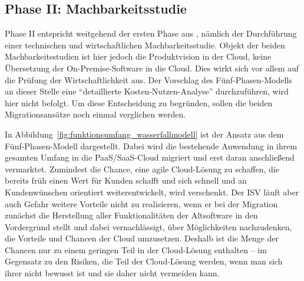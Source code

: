 \begin{comment}
\subsubsection{SWOT-Analyse}
Aus \pcite{}{}{cloud-computing_the_business_perspective}
\begin{description}
	\item[Strengths] \hfill \\
	\begin{itemize}
		\item Skalierbarkeit
		\item 
	\end{itemize}
	\item[Weaknesses] \hfill \\
	\item[Opportunities] \hfill \\
	\item[Threats] \hfill \\
	
\end{description}
\end{comment}



\subsection{Phase II: Machbarkeitsstudie}
\label{cha:phaseII}
Phase II entspricht weitgehend der ersten Phase aus , 
nämlich der Durchführung einer technischen und wirtschaftlichen 
Machbarkeitsstudie. Objekt der beiden Machbarkeitsstudien ist hier jedoch die 
Produktvision in der Cloud, keine Übersetzung der On-Premise-Software in die 
Cloud.
Dies wirkt sich vor allem auf die Prüfung der Wirtschaftlichkeit aus. Der 
Vorschlag des Fünf-Phasen-Modells an dieser Stelle eine "`detaillierte 
Kosten-Nutzen-Analyse"' durchzuführen, wird hier nicht 
befolgt. Um diese Entscheidung zu begründen, sollen die beiden 
Migrationsansätze noch einmal verglichen werden.


In Abbildung~\ref{fig:funktionsumfang_wasserfallmodell} ist der Ansatz aus dem 
Fünf-Phasen-Modell dargestellt. Dabei wird die bestehende Anwendung in ihrem 
gesamten Umfang in die PaaS/SaaS-Cloud migriert und erst daran anschließend 
vermarktet. Zumindest die Chance, eine agile Cloud-Lösung zu schaffen, die 
bereits früh einen Wert für Kunden schafft und sich schnell und an 
Kundenwünschen orientiert weiterentwickelt, wird verschenkt. Der ISV 
läuft aber auch Gefahr weitere Vorteile nicht zu realisieren, wenn er bei der 
Migration zunächst die Herstellung aller Funktionalitäten der Altsoftware in 
den Vordergrund stellt und dabei vernachlässigt, über Möglichkeiten 
nachzudenken, die Vorteile und Chancen der Cloud umzusetzen. Deshalb ist die 
Menge der Chancen nur zu einem geringen Teil in der Cloud-Lösung enthalten -- 
im Gegensatz zu den Risiken, die Teil der Cloud-Lösung werden, wenn man sich 
ihrer nicht bewusst ist und sie daher nicht vermeiden kann.

